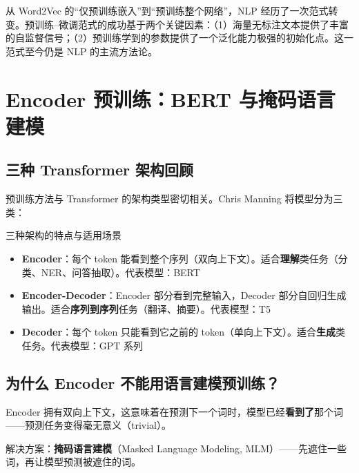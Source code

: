 \documentclass[a4paper]{article}
\begin{document}
从 Word2Vec 的``仅预训练嵌入''到``预训练整个网络''，NLP 经历了一次范式转变。预训练--微调范式的成功基于两个关键因素：（1）海量无标注文本提供了丰富的自监督信号；（2）预训练学到的参数提供了一个泛化能力极强的初始化点。这一范式至今仍是 NLP 的主流方法论。


\section{Encoder 预训练：BERT 与掩码语言建模}

\subsection{三种 Transformer 架构回顾}

预训练方法与 Transformer 的架构类型密切相关。Chris Manning 将模型分为三类：





\begin{knowledgebox}{三种架构的特点与适用场景}
\begin{itemize}
    \item \textbf{Encoder}：每个 token 能看到整个序列（双向上下文）。适合\textbf{理解}类任务（分类、NER、问答抽取）。代表模型：BERT
    \item \textbf{Encoder-Decoder}：Encoder 部分看到完整输入，Decoder 部分自回归生成输出。适合\textbf{序列到序列}任务（翻译、摘要）。代表模型：T5
    \item \textbf{Decoder}：每个 token 只能看到它之前的 token（单向上下文）。适合\textbf{生成}类任务。代表模型：GPT 系列
\end{itemize}
\end{knowledgebox}

\subsection{为什么 Encoder 不能用语言建模预训练？}

Encoder 拥有双向上下文，这意味着在预测下一个词时，模型已经\textbf{看到了}那个词——预测任务变得毫无意义（trivial）。





解决方案：\textbf{掩码语言建模}（Masked Language Modeling, MLM）——先遮住一些词，再让模型预测被遮住的词。
\end{document}
